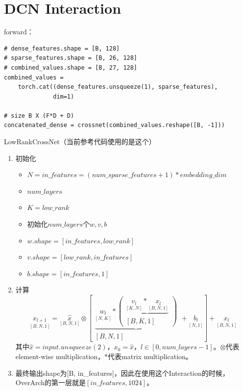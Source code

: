 \documentclass{article}
\begin{document}
\section{DCN Interaction}
forward：
\lstset{language=Python}
\begin{lstlisting}
# dense_features.shape = [B, 128]
# sparse_features.shape = [B, 26, 128]
# combined_values.shape = [B, 27, 128]
combined_values = 
    torch.cat((dense_features.unsqueeze(1), sparse_features), 
              dim=1)

# size B X (F*D + D)
concatenated_dense = crossnet(combined_values.reshape([B, -1]))
\end{lstlisting}
LowRankCrossNet（当前参考代码使用的是这个）
\begin{enumerate}
    \item 初始化
    \begin{itemize}
        \item $N=in\_features = (num\_sparse\_features + 1) * embedding\_dim$
        \item $num\_layers$
        \item $K=low\_rank$
        \item 初始化$num\_layers$个$w,v,b$
        \item $w.shape = [in\_features, low\_rank]$
        \item $v.shape = [low\_rank, in\_features]$
        \item $b.shape = [in\_features, 1]$
    \end{itemize}
    \item 计算
    $$
    \underset{[B,N,1]}{x_{l+1}}=
    \underset{[B,N,1]}{\hat{x}}\otimes
    \left[
        \begin{matrix}
            \underbrace{
                \underset{[N,K]}{w_l} \ast 
                    \left(
                        \begin{matrix}
                            \underbrace{\underset{[K,N]}{v_l} \ast \underset{[B,N,1]}{x_l}} \\ [B,K,1] 
                        \end{matrix} 
                    \right)
            } \\ [B,N,1] 
        \end{matrix} + \underset{[N,1]}{b_l}
    \right]
    +\underset{[B,N,1]}{x_l}
    $$
    其中$\hat{x}=input.unsqueeze(2)$，$x_0 = \hat{x}$，$l\in[0,num\_layers-1]$。$\otimes$代表element-wise multiplication，$\ast$代表matrix multiplication。
    \item 最终输出shape为[B, in\_features]，因此在使用这个Interaction的时候，OverArch的第一层就是$[in\_features, 1024]$。
\end{enumerate}
\end{document}
